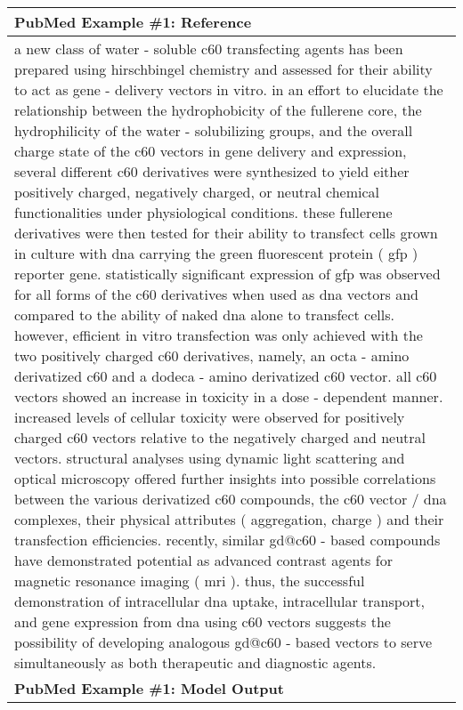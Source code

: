 \begin{table}[!htbp]
    \centering
    \tiny
    \begin{tabular}{p{\linewidth}} 
    \toprule
    \textbf{PubMed Example \#1: Reference} \\
    \midrule
a new class of water - soluble c60 transfecting agents has been prepared using hirschbingel chemistry and assessed for their ability to act as gene - delivery vectors in vitro. in an effort to elucidate the relationship between the hydrophobicity of the fullerene core, the hydrophilicity of the water - solubilizing groups, and the overall charge state of the c60 vectors in gene delivery and expression, several different c60 derivatives were synthesized to yield either positively charged, negatively charged, or neutral chemical functionalities under physiological conditions. these fullerene derivatives were then tested for their ability to transfect cells grown in culture with dna carrying the green fluorescent protein ( gfp ) reporter gene. statistically significant expression of gfp was observed for all forms of the c60 derivatives when used as dna vectors and compared to the ability of naked dna alone to transfect cells. however, efficient in vitro transfection was only achieved with the two positively charged c60 derivatives, namely, an octa - amino derivatized c60 and a dodeca - amino derivatized c60 vector. all c60 vectors showed an increase in toxicity in a dose - dependent manner. increased levels of cellular toxicity were observed for positively charged c60 vectors relative to the negatively charged and neutral vectors. structural analyses using dynamic light scattering and optical microscopy offered further insights into possible correlations between the various derivatized c60 compounds, the c60 vector / dna complexes, their physical attributes ( aggregation, charge ) and their transfection efficiencies. recently, similar gd@c60 - based compounds have demonstrated potential as advanced contrast agents for magnetic resonance imaging ( mri ). thus, the successful demonstration of intracellular dna uptake, intracellular transport, and gene expression from dna using c60 vectors suggests the possibility of developing analogous gd@c60 - based vectors to serve simultaneously as both therapeutic and diagnostic agents.
    \\
    \midrule
    \textbf{PubMed Example \#1: Model Output} \\
    \midrule

\end{tabular}
\end{table}

